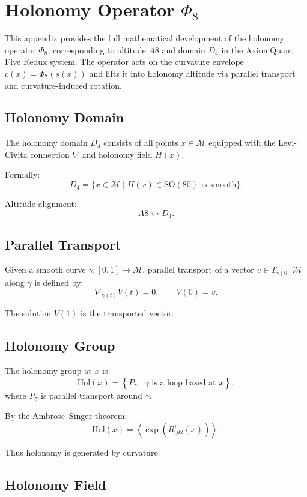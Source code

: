 \section{Holonomy Operator \texorpdfstring{$\Phi_8$}{Phi8}}
\label{sec:holonomy}

This appendix provides the full mathematical development of the holonomy
operator $\Phi_8$, corresponding to altitude $A8$ and domain $D_4$ in the
AxiomQuant Five Redux system. The operator acts on the curvature envelope
$c(x) = \Phi_7(s(x))$ and lifts it into holonomy altitude via parallel
transport and curvature-induced rotation.

\subsection{Holonomy Domain}

The holonomy domain $D_4$ consists of all points $x \in \mathcal{M}$ equipped
with the Levi-Civita connection $\nabla$ and holonomy field $H(x)$.

Formally:
\[
D_4 = \{ x \in \mathcal{M} \mid H(x) \in \mathrm{SO}(80) \text{ is smooth} \}.
\]

Altitude alignment:
\[
A8 \leftrightarrow D_4.
\]

\subsection{Parallel Transport}

Given a smooth curve $\gamma : [0,1] \to \mathcal{M}$, parallel transport of a
vector $v \in T_{\gamma(0)}\mathcal{M}$ along $\gamma$ is defined by:
\[
\nabla_{\dot{\gamma}(t)} V(t) = 0,
\qquad
V(0) = v.
\]

The solution $V(1)$ is the transported vector.

\subsection{Holonomy Group}

The holonomy group at $x$ is:
\[
\mathrm{Hol}(x) = 
\left\{
P_\gamma \mid \gamma \text{ is a loop based at } x
\right\},
\]
where $P_\gamma$ is parallel transport around $\gamma$.

By the Ambrose–Singer theorem:
\[
\mathrm{Hol}(x) = 
\left\langle
\exp\!\left( R^i_{\ jkl}(x) \right)
\right\rangle.
\]

Thus holonomy is generated by curvature.

\subsection{Holonomy Field}

